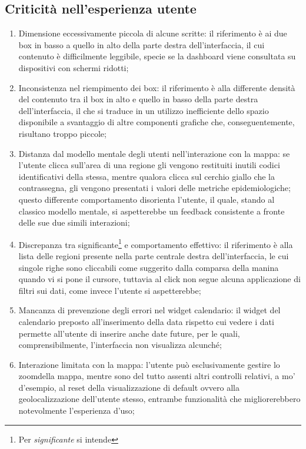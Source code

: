 \documentclass[../../main.tex]{subfiles}
\begin{document}
\subsection{Criticità nell'esperienza utente}
\begin{enumerate}
    \item Dimensione eccessivamente piccola di alcune scritte: il riferimento è ai due box in basso a quello in alto della parte destra dell'interfaccia, il cui contenuto è difficilmente leggibile, specie se la dashboard viene consultata su dispositivi con schermi ridotti;
    \item Inconsistenza nel riempimento dei box: il riferimento è alla differente densità del contenuto tra il box in alto e quello in basso della parte destra dell'interfaccia, il che si traduce in un utilizzo inefficiente dello spazio disponibile a svantaggio di altre componenti grafiche che, conseguentemente, risultano troppo piccole;
    \item Distanza dal modello mentale degli utenti nell'interazione con la mappa: se l'utente clicca sull'area di una regione gli vengono restituiti inutili codici identificativi della stessa, mentre qualora clicca sul cerchio giallo che la contrassegna, gli vengono presentati i valori delle metriche epidemiologiche; questo differente comportamento disorienta l'utente, il quale, stando al classico modello mentale, si aspetterebbe un feedback consistente a fronte delle sue due simili interazioni;
    \item Discrepanza tra significante\footnote{Per \textit{significante} si intende }  e comportamento effettivo: il riferimento è alla lista delle regioni presente nella parte centrale destra dell'interfaccia, le cui singole righe sono cliccabili come suggerito dalla comparsa della manina quando vi si pone il cursore, tuttavia al click non segue alcuna applicazione di filtri sui dati, come invece l'utente si aspetterebbe;
    \item Mancanza di prevenzione degli errori nel widget calendario: il widget del calendario preposto all'inserimento della data rispetto cui vedere i dati permette all'utente di inserire anche date future, per le quali, comprensibilmente, l'interfaccia non visualizza alcunché;
    \item Interazione limitata con la mappa: l'utente può esclusivamente gestire lo zoomdella mappa, mentre sono del tutto assenti altri controlli relativi, a mo' d'esempio, al reset della visualizzazione di default ovvero alla geolocalizzazione dell'utente stesso, entrambe funzionalità che migliorerebbero notevolmente l'esperienza d'uso;

\end{enumerate}
\end{document}

